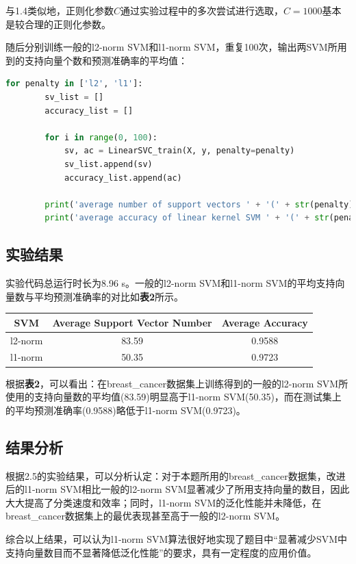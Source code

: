 \documentclass[12pt]{article}
\begin{document}
\par 
与1.4类似地，正则化参数$C$通过实验过程中的多次尝试进行选取，$C=1000$基本是较合理的正则化参数。\par 
随后分别训练一般的l2-norm SVM和l1-norm SVM，重复100次，输出两SVM所用到的支持向量个数和预测准确率的平均值：
\begin{lstlisting}[language=python]
	for penalty in ['l2', 'l1']:
		sv_list = []
		accuracy_list = []
	
		for i in range(0, 100):
			sv, ac = LinearSVC_train(X, y, penalty=penalty)
			sv_list.append(sv)
			accuracy_list.append(ac)
	
		print('average number of support vectors ' + '(' + str(penalty) + '-form): ' + str("%.2f" % np.mean(sv_list)))
		print('average accuracy of linear kernel SVM ' + '(' + str(penalty) + '-form): ' + str("%.4f" % np.mean(accuracy_list)))
\end{lstlisting}
\vbox{}
\subsection{实验结果}
实验代码总运行时长为8.96 s。一般的l2-norm SVM和l1-norm SVM的平均支持向量数与平均预测准确率的对比如\textbf{表2}所示。
\begin{table}[h]
	\centering
	\begin{tabular}{ccc}
		\toprule
		SVM & Average Support Vector Number & Average Accuracy\\
		\midrule
		l2-norm & 83.59 & 0.9588 \\
		l1-norm & 50.35 & 0.9723 \\
		\bottomrule
	\end{tabular}
\end{table}
\par
根据\textbf{表2}，可以看出：在breast\_cancer数据集上训练得到的一般的l2-norm SVM所使用的支持向量数的平均值(83.59)明显高于l1-norm SVM(50.35)，而在测试集上的平均预测准确率(0.9588)略低于l1-norm SVM(0.9723)。
\subsection{结果分析}
根据2.5的实验结果，可以分析认定：对于本题所用的breast\_cancer数据集，改进后的l1-norm SVM相比一般的l2-norm SVM显著减少了所用支持向量的数目，因此大大提高了分类速度和效率；同时，l1-norm SVM的泛化性能并未降低，在breast\_cancer数据集上的最优表现甚至高于一般的l2-norm SVM。\par 
综合以上结果，可以认为l1-norm SVM算法很好地实现了题目中“显著减少SVM中支持向量数目而不显著降低泛化性能”的要求，具有一定程度的应用价值。

   

\vbox{}



\end{document}
